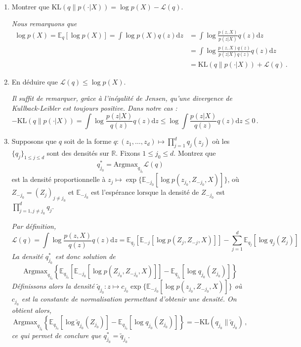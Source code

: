 \documentclass[a4paper,10pt,fleqn]{article}
\newcommand{\rset}{\ensuremath{\mathbb{R}}}
\newcommand{\1}{\ensuremath{\mathbbm{1}}}
\begin{document}
\begin{enumerate}
\item Montrer que $\mathrm{KL}(q\|p(\cdot|X)) = \log p(X) - \mathcal{L}(q) $.

\vspace{.2cm}

{\em
Nous remarquons que 
\begin{align*}
\log p(X) =\mathbb{E}_q\left[\log p(X)\right] = \int \log p(X) q(z) \mathrm{d} z &= \int \log \frac{p(z,X)}{p(z|X)} q(z) \mathrm{d} z\\
&  = \int \log \frac{p(z,X)q(z)}{p(z|X)q(z)} q(z) \mathrm{d} z\\
&= \mathrm{KL}(q\|p(\cdot|X)) + \mathcal{L}(q)  \,.
\end{align*}
}
\item En d\'eduire que $\mathcal{L}(q) \leq \log p(X)$.

\vspace{.2cm}

{\em
Il suffit de remarquer, gr\^ace \`a l'in\'egalit\'e de Jensen, qu'une divergence de Kullback-Leibler est toujours positive. Dans notre cas :
$$
-\mathrm{KL}(q\|p(\cdot|X))  =  \int \log \frac{p(z|X)}{q(z)} q(z) \mathrm{d} z \leq  \log \int \frac{p(z|X)}{q(z)} q(z) \mathrm{d} z \leq 0\,.
$$
}
\item Supposons que $q$ soit de la forme $q:(z_1,\ldots,z_d)\mapsto \prod_{j=1}^dq_j(z_j)$ o\`u les $\{q_j\}_{1\leq j\leq d}$ sont des densit\'es sur $\rset$. Fixons $1\leq j_0 \leq d$. Montrez que 
$$
q_{j_0}^* = \mathrm{Argmax}_{q_{j_0}} \mathcal{L}(q) 
$$
est la densit\'e proportionnelle \`a $z_j \mapsto \exp\{\mathbb{E}_{-j_0}[\log p (z_{j_0},Z_{-j_0},X)]\}$, o\`u $Z_{-j_0} = (Z_j)_{j\neq j_0}$ et $\mathbb{E}_{-j_0}$ est l'esp\'erance lorsque la densit\'e de $Z_{-j_0}$ est $\prod_{j=1,j\neq j_0}^dq_j$.

\vspace{.2cm}

{\em
Par d\'efinition,
$$
\mathcal{L}(q)  = \int \log\frac{p(z,X)}{q(z)}q(z) \mathrm{d} z = \mathbb{E}_{q_j}\left[\mathbb{E}_{-j}\left[\log p(Z_j,Z_{-j},X)\right]\right] - \sum_{j=1}^d\mathbb{E}_{q_j}\left[\log q_j(Z_j)\right]
$$
La densit\'e $q_{j_0}^*$ est donc solution de 
$$
\mathrm{Argmax}_{q_{j_0}} \left\{\mathbb{E}_{q_{j_0}}\left[\mathbb{E}_{-j_0}\left[\log p(Z_{j_0},Z_{-j_0},X)\right]\right] - \mathbb{E}_{q_{j_0}}\left[\log q_{j_0}(Z_{j_0})\right]\right\}
$$ 
D\'efinissons alors la densit\'e $\tilde q_{j_0}:z\mapsto c_{j_0}\exp\{\mathbb{E}_{-j_0}[\log p (z_{j_0},Z_{-j_0},X)]\}$ o\`u $c_{j_0}$ est la constante de normalisation permettant d'obtenir une densit\'e. On obtient alors,
$$
\mathrm{Argmax}_{q_{j_0}} \left\{\mathbb{E}_{q_{j_0}}\left[\log \tilde q_{j_0}(Z_{j_0})\right] - \mathbb{E}_{q_{j_0}}\left[\log q_{j_0}(Z_{j_0})\right]\right\} = - \mathrm{KL}(q_{j_0}\|\tilde q_{j_0})  \,,
$$ 
ce qui permet de conclure que $q_{j_0}^* = \tilde q_{j_0}$.
}


\end{enumerate}
\end{document}
